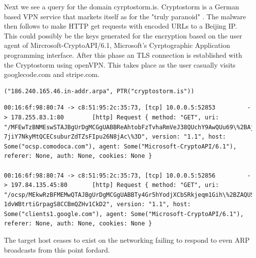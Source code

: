 \documentclass[11pt]{diazessay} %
\begin{document}
Next we see a query for the domain cyrptostorm.is. Cryptostorm is a German based VPN service that markets itself as for the "truly paranoid" \cite{cryptostorm}. The malware then follows to make HTTP get requests with encoded URLs to a Beijing IP. This could possibly be the keys generated for the encryption based on the user agent of Mircrosoft-CryptoAPI/6.1, Microsoft's Cyrptographic Application programming interface. After this phase an TLS connection is established with the Cryptostorm using openVPN. This takes place as the user casually visits googlecode.com and stripe.com. 

\begin{lstlisting}
("186.240.165.46.in-addr.arpa", PTR("cryptostorm.is"))
\end{lstlisting}

\begin{lstlisting}
00:16:6f:98:80:74 -> c8:51:95:2c:35:73, [tcp] 10.0.0.5:52853         -> 178.255.83.1:80        [http] Request { method: "GET", uri: "/MFEwTzBNMEswSTAJBgUrDgMCGgUABBReAhtobFzTvhaRmVeJ38QUchY9AwQUu69\%2BAj36pvE8hI6t
7jiY7NkyMtQCECsuburZdTZsFIpu26N8jAc\%3D", version: "1.1", host: Some("ocsp.comodoca.com"), agent: Some("Microsoft-CryptoAPI/6.1"), referer: None, auth: None, cookies: None }

00:16:6f:98:80:74 -> c8:51:95:2c:35:73, [tcp] 10.0.0.5:52856         -> 197.84.135.45:80       [http] Request { method: "GET", uri: "/ocsp/MEkwRzBFMEMwQTAJBgUrDgMCGgUABBTy4Gr5hYodjXCbSRkjeqm1Gih\%2BZAQUSt0GFhu89mi
1dvWBtrtiGrpagS8CCBmQZHv1CkD2", version: "1.1", host: Some("clients1.google.com"), agent: Some("Microsoft-CryptoAPI/6.1"), referer: None, auth: None, cookies: None }
\end{lstlisting}


The target host ceases to exist on the networking failing to respond to even ARP broadcasts from this point fordard. 
\end{document}
